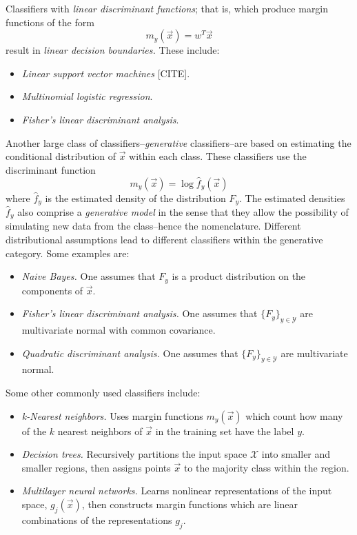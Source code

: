 Classifiers with \emph{linear discriminant functions}; that is, which produce margin functions of the form
\[
m_y(\vec{x}) = w^T \vec{x}
\]
result in \emph{linear decision boundaries.}  These include:
\begin{itemize}
\item \emph{Linear support vector machines} [CITE].
\item \emph{Multinomial logistic regression}.
\item \emph{Fisher's linear discriminant analysis}.
\end{itemize}

Another large class of classifiers--\emph{generative} classifiers--are based on estimating the
conditional distribution of $\vec{x}$ within each class.
These classifiers use the discriminant function
\[
m_y(\vec{x}) = \log \hat{f}_y(\vec{x})
\]
where $\hat{f}_y$ is the estimated density of the distribution $F_y$.
The estimated densities $\hat{f}_y$ also comprise a \emph{generative
  model} in the sense that they allow the possibility of simulating
new data from the class--hence the nomenclature.  Different
distributional assumptions lead to different classifiers within the
generative category.  Some examples are:
\begin{itemize}
\item \emph{Naive Bayes.}  One assumes that $F_y$ is a product distribution on the components of $\vec{x}$.
\item \emph{Fisher's linear discriminant analysis.}  One assumes that $\{F_y\}_{y \in \mathcal{Y}}$ are multivariate normal with common covariance.
\item \emph{Quadratic discriminant analysis.}  One assumes that $\{F_y\}_{y \in \mathcal{Y}}$ are multivariate normal.
\end{itemize}

Some other commonly used classifiers include:
\begin{itemize}
\item \emph{k-Nearest neighbors.}  Uses margin functions
  $m_y(\vec{x})$ which count how many of the $k$ nearest neighbors of
  $\vec{x}$ in the training set have the label $y$.
\item \emph{Decision trees.}  Recursively partitions the input space
  $\mathcal{X}$ into smaller and smaller regions, then assigns points
  $\vec{x}$ to the majority class within the region.
\item \emph{Multilayer neural networks.}  Learns nonlinear
  representations of the input space, $g_j(\vec{x})$, then constructs
  margin functions which are linear combinations of the
  representations $g_j$.
\end{itemize}

